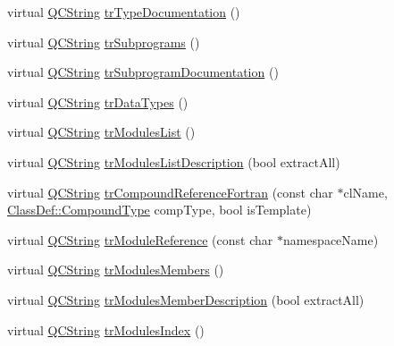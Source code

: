 \begin{DoxyCompactItemize}
\item 
virtual \mbox{\hyperlink{class_q_c_string}{Q\+C\+String}} \mbox{\hyperlink{class_translator_croatian_a00d80d36c26b46e2c01cba0e9c07d189}{tr\+Type\+Documentation}} ()
\item 
virtual \mbox{\hyperlink{class_q_c_string}{Q\+C\+String}} \mbox{\hyperlink{class_translator_croatian_af5a1ef3be00c4213e9f98f1064233407}{tr\+Subprograms}} ()
\item 
virtual \mbox{\hyperlink{class_q_c_string}{Q\+C\+String}} \mbox{\hyperlink{class_translator_croatian_ab4fa9162851c02e3b7332bd6e6ce75b7}{tr\+Subprogram\+Documentation}} ()
\item 
virtual \mbox{\hyperlink{class_q_c_string}{Q\+C\+String}} \mbox{\hyperlink{class_translator_croatian_ae56de72f5f2b9fca50e762a1c09006c9}{tr\+Data\+Types}} ()
\item 
virtual \mbox{\hyperlink{class_q_c_string}{Q\+C\+String}} \mbox{\hyperlink{class_translator_croatian_aa2eb500fb2597d7b76330e30ee455e74}{tr\+Modules\+List}} ()
\item 
virtual \mbox{\hyperlink{class_q_c_string}{Q\+C\+String}} \mbox{\hyperlink{class_translator_croatian_a64ef6563dc8cdbb23826799c396542b8}{tr\+Modules\+List\+Description}} (bool extract\+All)
\item 
virtual \mbox{\hyperlink{class_q_c_string}{Q\+C\+String}} \mbox{\hyperlink{class_translator_croatian_a1bd0a40809c2703b5889e85efb06751a}{tr\+Compound\+Reference\+Fortran}} (const char $\ast$cl\+Name, \mbox{\hyperlink{class_class_def_ae70cf86d35fe954a94c566fbcfc87939}{Class\+Def\+::\+Compound\+Type}} comp\+Type, bool is\+Template)
\item 
virtual \mbox{\hyperlink{class_q_c_string}{Q\+C\+String}} \mbox{\hyperlink{class_translator_croatian_abb14abc827157cd52d6e34777608c329}{tr\+Module\+Reference}} (const char $\ast$namespace\+Name)
\item 
virtual \mbox{\hyperlink{class_q_c_string}{Q\+C\+String}} \mbox{\hyperlink{class_translator_croatian_affc180feb6c2ba141af784532b38dad7}{tr\+Modules\+Members}} ()
\item 
virtual \mbox{\hyperlink{class_q_c_string}{Q\+C\+String}} \mbox{\hyperlink{class_translator_croatian_a6b48597f47640e0cadd1a6c4f551cc49}{tr\+Modules\+Member\+Description}} (bool extract\+All)
\item 
virtual \mbox{\hyperlink{class_q_c_string}{Q\+C\+String}} \mbox{\hyperlink{class_translator_croatian_a9964e73c7bb1aceae539df16ca9de1e5}{tr\+Modules\+Index}} ()
\item 

\end{DoxyCompactItemize}
